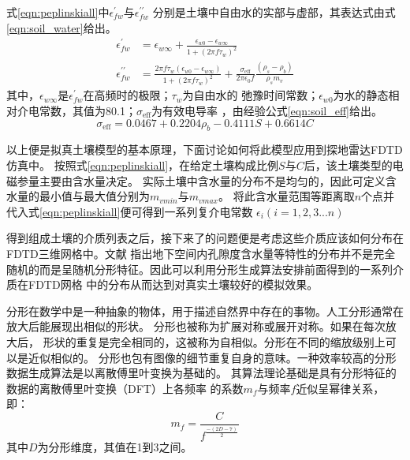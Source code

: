 式\ref{eqn:peplinskiall}中$\epsilon_{f w}^{\prime}$与$\epsilon_{f w}^{\prime \prime}$
分别是土壤中自由水的实部与虚部，其表达式由式\ref{eqn:soil_water}给出。
\begin{equation} 
	\label{eqn:soil_water}
	\begin{aligned}
		\epsilon_{f w}^{\prime}&=\epsilon_{w \infty}+\frac{\epsilon_{w 0}-\epsilon_{w \infty}}{1+\left(2 \pi f \tau_{w}\right)^{2}} \\
		\epsilon_{f w}^{\prime \prime}&=\frac{2 \pi f \tau_{w}\left(\epsilon_{w 0}-\epsilon_{w \infty}\right)}{1+\left(2 \pi f \tau_{w}\right)^{2}}+\frac{\sigma_{\mathrm{eff}}}{2 \pi \epsilon_{0} f} \frac{\left(\rho_{s}-\rho_{b}\right)}{\rho_{s} m_{v}}
	\end{aligned}
\end{equation}
其中，$\epsilon_{w \infty}$是$\epsilon_{f w}^{\prime}$在高频时的极限；$\tau_{w}$为自由水的
弛豫时间常数；$\epsilon_{w 0}$为水的静态相对介电常数，其值为80.1；$\sigma_{\mathrm{eff}}$为有效电导率
，由经验公式\ref{eqn:soil_eff}给出。
\begin{equation}
	\label{eqn:soil_eff}
\sigma_{\mathrm{eff}}=0.0467+0.2204 \rho_{b}-0.4111 S+0.6614 C
\end{equation}

以上便是拟真土壤模型的基本原理，下面讨论如何将此模型应用到探地雷达FDTD仿真中。
按照式\ref{eqn:peplinskiall}，在给定土壤构成比例$S$与$C$后，该土壤类型的电磁参量主要由含水量决定。
实际土壤中含水量的分布不是均匀的，因此可定义含水量的最小值与最大值分别为$m_{vmin}$与$m_{vmax}$。
将此含水量范围等距离取$n$个点并代入式\ref{eqn:peplinskiall}便可得到一系列复介电常数
$\epsilon_i(i=1,2,3...n)$ 

得到组成土壤的介质列表之后，接下来了的问题便是考虑这些介质应该如何分布在FDTD三维网格中。文献
\cite{turcotte1997fractals}
指出地下空间内孔隙度含水量等特性的分布并不是完全随机的而是呈随机分形特征。因此可以利用分形生成算法安排前面得到的一系列介质在FDTD网格
中的分布从而达到对真实土壤较好的模拟效果。

分形在数学中是一种抽象的物体，用于描述自然界中存在的事物。人工分形通常在放大后能展现出相似的形状。 
分形也被称为扩展对称或展开对称。如果在每次放大后，
形状的重复是完全相同的，这被称为自相似。分形在不同的缩放级别上可以是近似相似的。 
分形也包有图像的细节重复自身的意味。一种效率较高的分形数据生成算法是以离散傅里叶变换为基础的。
其算法理论基础是具有分形特征的数据的离散傅里叶变换（DFT）上各频率
的系数$m_f$与频率$f$近似呈幂律关系，即：
\begin{equation}
m_f = \frac{C}{f^{\frac{-(2 D-7)}{2}}}
\end{equation}
其中$D$为分形维度，其值在1到3之间。

